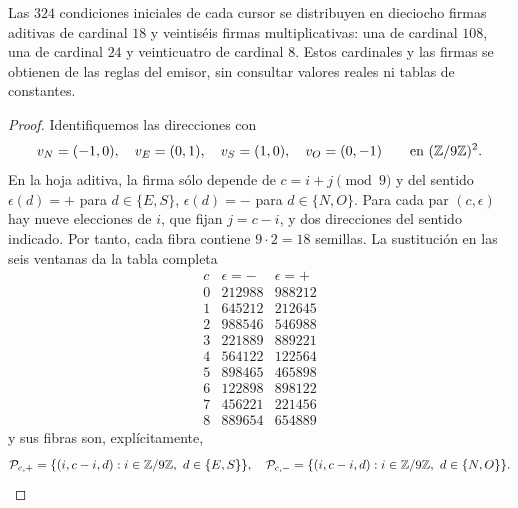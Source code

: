 \begin{lemma}
\label{lem:censo-interno-firmas}
Las \(324\) condiciones iniciales de cada cursor se distribuyen en dieciocho
firmas aditivas de cardinal \(18\) y veintiséis firmas multiplicativas: una
de cardinal \(108\), una de cardinal \(24\) y veinticuatro de cardinal \(8\).
Estos cardinales y las firmas se obtienen de las reglas del emisor, sin
consultar valores reales ni tablas de constantes.
\end{lemma}
\begin{proof}
Identifiquemos las direcciones con
\[
 v_N=(-1,0),\quad v_E=(0,1),\quad
 v_S=(1,0),\quad v_O=(0,-1)
 \qquad\text{en }(\mathbb Z/9\mathbb Z)^2.
\]
En la hoja aditiva, la firma sólo depende de
\(c=i+j\pmod9\) y del sentido
\(\epsilon(d)=+\) para \(d\in\{E,S\}\),
\(\epsilon(d)=-\) para \(d\in\{N,O\}\). Para cada par
\((c,\epsilon)\) hay nueve elecciones de \(i\), que fijan \(j=c-i\), y
dos direcciones del sentido indicado. Por tanto, cada fibra contiene
\(9\cdot2=18\) semillas. La sustitución en las seis ventanas da la tabla
completa
\[
\begin{array}{c|cc}
c&\epsilon=-&\epsilon=+\\ \hline
0&212988&988212\\
1&645212&212645\\
2&988546&546988\\
3&221889&889221\\
4&564122&122564\\
5&898465&465898\\
6&122898&898122\\
7&456221&221456\\
8&889654&654889
\end{array}
\tag{A}
\label{eq:tabla-firmas-aditivas}
\]
y sus fibras son, explícitamente,
\[
 \mathcal P_{c,+}=\{(i,c-i,d):i\in\ZZ/9\ZZ,\ d\in\{E,S\}\},
 \quad
 \mathcal P_{c,-}=\{(i,c-i,d):i\in\ZZ/9\ZZ,\ d\in\{N,O\}\}.
\]


\end{proof}
